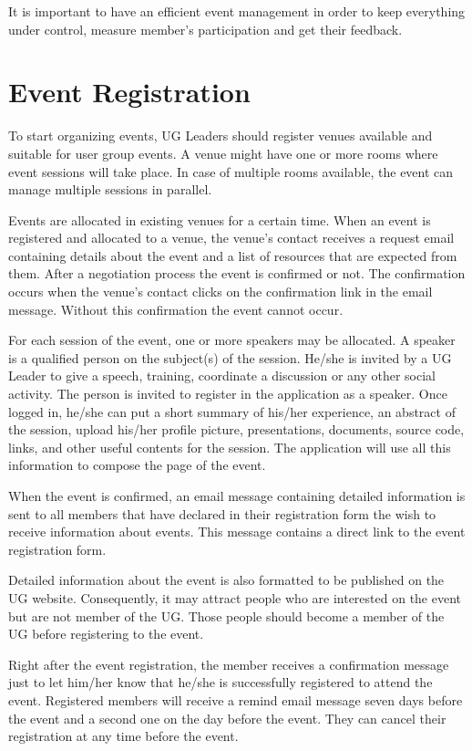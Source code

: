 \documentclass[envcountsame,envcountchap]{svmono}
\begin{document}
It is important to have an efficient event management in order to keep everything under control, measure member's participation and get their feedback.

\section{Event Registration}

To start organizing events, UG Leaders should register venues available and suitable for user group events. A venue might have one or more rooms where event sessions will take place. In case of multiple rooms available, the event can manage multiple sessions in parallel.

Events are allocated in existing venues for a certain time. When an event is registered and allocated to a venue, the venue's contact receives a request email containing details about the event and a list of resources that are expected from them. After a negotiation process the event is confirmed or not. The confirmation occurs when the venue's contact clicks on the confirmation link in the email message. Without this confirmation the event cannot occur.

For each session of the event, one or more speakers may be allocated. A speaker is a qualified person on the subject(s) of the session. He/she is invited by a UG Leader to give a speech, training, coordinate a discussion or any other social activity. The person is invited to register in the application as a speaker.  Once logged in, he/she can put a short summary of his/her experience, an abstract of the session, upload his/her profile picture, presentations, documents, source code, links, and other useful contents for the session. The application will use all this information to compose the page of the event.

When the event is confirmed, an email message containing detailed information is sent to all members that have declared in their registration form the wish to receive information about events. This message contains a direct link to the event registration form.

Detailed information about the event is also formatted to be published on the UG website. Consequently, it may attract people who are interested on the event but are not member of the UG. Those people should become a member of the UG before registering to the event.

Right after the event registration, the member receives a confirmation message just to let him/her know that he/she is successfully registered to attend the event. Registered members will receive a remind email message seven days before the event and a second one on the day before the event. They can cancel their registration at any time before the event.
\end{document}
